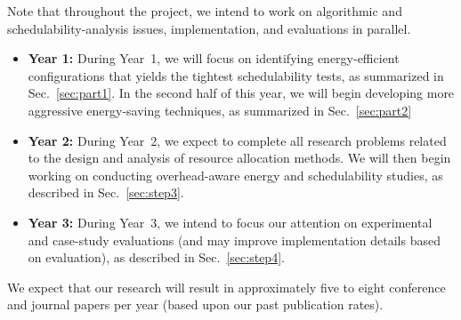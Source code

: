 Note that throughout the project, we intend to work on algorithmic and schedulability-analysis issues, implementation, and evaluations in parallel.

\begin{itemize}
\vspace{-1mm}
\item \textbf{Year 1:} During Year~1, we will focus on identifying energy-efficient configurations that yields the tightest schedulability tests, as summarized in Sec.~\ref{sec:part1}. In the second half of this year, we will begin  developing more aggressive energy-saving techniques, as summarized in Sec.~\ref{sec:part2}
\vspace{-1mm}
\item \textbf{Year 2:} During Year~2, we expect to complete all research problems related to the design and analysis of resource allocation methods. We will then begin working on conducting overhead-aware energy and schedulability studies, as described in Sec.~\ref{sec:step3}.
\vspace{-1mm}
\item \textbf{Year 3:} During Year~3, we intend to focus our attention on experimental and case-study evaluations (and  may improve implementation details based on evaluation), as described in Sec.~\ref{sec:step4}.
\end{itemize}

\vspace{-1mm}
We expect that our research will result in approximately five to eight conference and journal papers per year (based upon our past publication rates).

